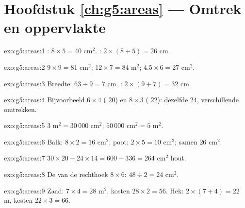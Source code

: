 \section*{Hoofdstuk \ref{ch:g5:areas} --- Omtrek en oppervlakte}

\begin{solution}{exo:g5:areas:1}
: $8 \times 5 = 40$ cm$^2$. : $2 \times (8 + 5) = 26$ cm.
\end{solution}

\begin{solution}{exo:g5:areas:2}
$9 \times 9 = 81$ cm$^2$; \quad $12 \times 7 = 84$ m$^2$; \quad
$4.5 \times 6 = 27$ cm$^2$.
\end{solution}

\begin{solution}{exo:g5:areas:3}
Breedte: $63 \div 9 = 7$ cm. : $2 \times (9 + 7) = 32$ cm.
\end{solution}

\begin{solution}{exo:g5:areas:4}
Bijvoorbeeld $6 \times 4$ ( $20$) en $8 \times 3$ ( $22$):
dezelfde  $24$, verschillende omtrekken.
\end{solution}

\begin{solution}{exo:g5:areas:5}
$3$ m$^2 = 30\,000$ cm$^2$; \quad $50\,000$ cm$^2 = 5$ m$^2$.
\end{solution}

\begin{solution}{exo:g5:areas:6}
Balk: $8 \times 2 = 16$ cm$^2$; poot: $2 \times 5 = 10$ cm$^2$; samen $26$
cm$^2$.
\end{solution}

\begin{solution}{exo:g5:areas:7}
$30 \times 20 - 24 \times 14 = 600 - 336 = 264$ cm$^2$ hout.
\end{solution}

\begin{solution}{exo:g5:areas:8}
De  van de rechthoek $8 \times 6$: $48 \div 2 = 24$ cm$^2$.
\end{solution}

\begin{solution}{exo:g5:areas:9}
Zaad:  $7 \times 4 = 28$ m$^2$, kosten $28 \times 2 = 56$. Hek:
 $2 \times (7 + 4) = 22$ m, kosten $22 \times 3 = 66$.
\end{solution}

